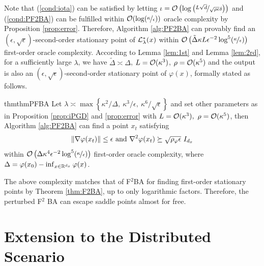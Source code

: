 \documentclass{article}
\begin{document}
Note that (\ref{cond:iota}) can be satisfied by letting
$ \iota = {\mathcal{O}}\left( \log \left(\nicefrac{L\sqrt{d}}{\sqrt{\rho \epsilon}\delta}\right)\right)$ and 
(\ref{cond:PF2BA}) can be fulfilled within ${\mathcal{O}}(\log(\nicefrac{\kappa}{\epsilon}))$ oracle complexity by Proposition \ref{prop:error}.
Therefore, Algorithm \ref{alg:PF2BA} can provably find an $(\epsilon,\sqrt{ \epsilon})$-second-order stationary point of ${\mathcal{L}}_{\lambda}^*(x)$ within ${\mathcal{O}}\left(\tilde \Delta \kappa L \epsilon^{-2} \log^5(\nicefrac{\kappa}{\epsilon})\right)$ first-order oracle complexity.
According to Lemma \ref{lem:1st} and Lemma \ref{lem:2rd}, for a sufficiently large $\lambda$, we have $\tilde \Delta \asymp \Delta$, $L= {\mathcal{O}}(\kappa^3)$, $\rho = {\mathcal{O}}(\kappa^5) $ and the output is also an $(\epsilon,\sqrt{\epsilon})$-second-order stationary point of $\varphi(x)$, formally stated as follows. 

\begin{restatable}{thm}{thmPFBA}\label{thm:PF2BA}
Let $\lambda \asymp \max\left\{ \kappa^2/ \Delta, ~ \kappa^3 / \epsilon,~\kappa^6 / \sqrt{\epsilon} \right\} $
and set other parameters as in Proposition \ref{prop:iPGD} and
 \ref{prop:error} with $L = {\mathcal{O}}(\kappa^3),~\rho = {\mathcal{O}}(\kappa^5)$, then 
Algorithm \ref{alg:PF2BA} can find a point  $x_t$ satisfying 
\begin{align*}
    \Vert \nabla \varphi(x_t) \Vert \le \epsilon~{\rm and}~  \nabla^2 \varphi(x_t) \succeq \sqrt{\rho_\varphi \epsilon }~ I_{d_x}
\end{align*}
within $ {\mathcal{O}}\left(\Delta \kappa^4 \epsilon^{-2} \log^5(\nicefrac{\kappa}{\epsilon})\right) $ first-order oracle complexity, where $\Delta =\varphi(x_0)-\inf_{x \in {\mathbb{R}}^{d_x} } \varphi(x) $.
\end{restatable}
The above complexity matches that of F${}^2$BA for finding first-order stationary points by Theorem \ref{thm:F2BA}, up to only logarithmic factors. Therefore, the perturbed F${}^2$ BA 
can escape saddle points almost for free.

\section{Extension to the Distributed Scenario} \label{sec:distributed}
\end{document}
